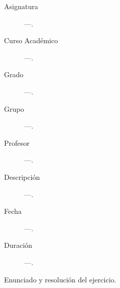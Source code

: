 \documentclass[12pt]{article}
\begin{document}

    
    

    \begin{description}
        \item[Asignatura] ---.
        \item[Curso Académico] ---.
        \item[Grado] ---.
        \item[Grupo] ---.
        \item[Profesor] ---.
        \item[Descripción] ---.
        \item[Fecha] ---.
        \item[Duración] ---.
    
    \end{description}
    \newpage


    
    \begin{ejercicio}[X puntos]
        Enunciado y resolución del ejercicio.
    \end{ejercicio}
\end{document}
